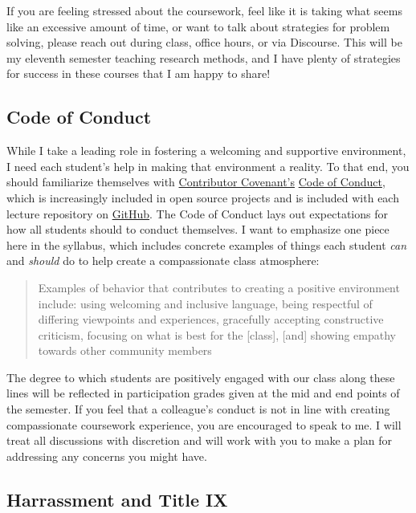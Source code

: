 \documentclass[]{book}
\begin{document}
If you are feeling stressed about the coursework, feel like it is taking what seems like an excessive amount of time, or want to talk about strategies for problem solving, please reach out during class, office hours, or via Discourse. This will be my eleventh semester teaching research methods, and I have plenty of strategies for success in these courses that I am happy to share!

\hypertarget{code-of-conduct}{%
\subsection{Code of Conduct}\label{code-of-conduct}}

While I take a leading role in fostering a welcoming and supportive environment, I need each student's help in making that environment a reality. To that end, you should familiarize themselves with \href{https://www.contributor-covenant.org}{Contributor Covenant's} \href{https://www.contributor-covenant.org/version/1/4/code-of-conduct}{Code of Conduct}, which is increasingly included in open source projects and is included with each lecture repository on \href{https://github.com/slu-soc5650}{GitHub}. The Code of Conduct lays out expectations for how all students should to conduct themselves. I want to emphasize one piece here in the syllabus, which includes concrete examples of things each student \emph{can} and \emph{should} do to help create a compassionate class atmosphere:

\begin{quote}
Examples of behavior that contributes to creating a positive environment include: using welcoming and inclusive language, being respectful of differing viewpoints and experiences, gracefully accepting constructive criticism, focusing on what is best for the {[}class{]}, {[}and{]} showing empathy towards other community members
\end{quote}

The degree to which students are positively engaged with our class along these lines will be reflected in participation grades given at the mid and end points of the semester. If you feel that a colleague's conduct is not in line with creating compassionate coursework experience, you are encouraged to speak to me. I will treat all discussions with discretion and will work with you to make a plan for addressing any concerns you might have.

\hypertarget{harrassment-and-title-ix}{%
\subsection{Harrassment and Title IX}\label{harrassment-and-title-ix}}
\end{document}
